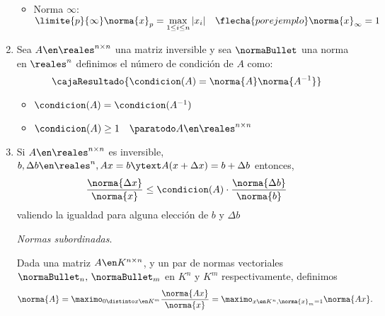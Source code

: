 \begin{enumerate}[label=\tiny\purple{\faIcon{snowman}}]
\begin{itemize}
          \item Norma $\infty$:
                $\limite{p}{\infty} \norma{x}_p = \max\limits_{1\leq i \leq n} |x_i|
                  \quad
                  \flecha{por ejemplo}
                  \norma{x}_{\infty} = 1 \quad$
        \end{itemize}

  \item Sea $A \en \reales^{n \times n}$ una matriz inversible y sea $\normaBullet$ una norma en
        $\reales^n$ definimos el número de condición de $A$ como:
        $$
          \cajaResultado{
            \condicion(A) = \norma{A}\norma{A^{-1}}
          }
        $$
        \begin{itemize}
          \item $\condicion(A) = \condicion(A^{-1})$
          \item $\condicion(A) \geq 1 \quad \paratodo A \en \reales^{n \times n}$
        \end{itemize}
  \item Si $A \en \reales^{n \times n}$ es inversible, $b, \Delta b \en \reales^{n}, Ax = b \ytext A(x + \Delta x) = b + \Delta b$ entonces,
        $$
          \frac{\norma{\Delta x}}{\norma{x}} \leq \condicion(A) \cdot \frac{\norma{\Delta b}}{\norma{b}}
        $$
        valiendo la igualdad para alguna elección de $b$ y $\Delta b$

        \textit{Normas subordinadas}.

        Dada una matriz $A \en K^{n \times n}$, y un par de normas vectoriales $\normaBullet_n,\, \normaBullet_m$ en $K^n$ y $K^m$
        respectivamente, definimos
        $$
          \norma{A} =
          \maximo_{0 \distinto x\en K^m} \frac{ \norma{Ax}}{\norma{x}} =
          \maximo_{x \en K^n, \norma{x}_m = 1} \norma{Ax}.
        $$


\end{enumerate}
